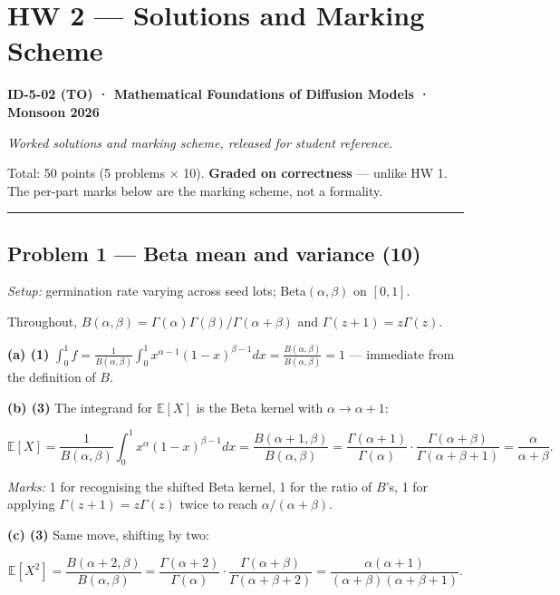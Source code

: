 \documentclass[
  11pt,
  a4paper,
]{article}
\author{}
\date{}
\newcommand{\EE}{\mathbb{E}}
\begin{document}
\section{HW 2 --- Solutions and Marking
Scheme}\label{hw-2-solutions-and-marking-scheme}

\textbf{ID-5-02 (TO) · Mathematical Foundations of Diffusion Models ·
Monsoon 2026}

\emph{Worked solutions and marking scheme, released for student
reference.}

Total: 50 points (5 problems × 10). \textbf{Graded on correctness} ---
unlike HW 1. The per-part marks below are the marking scheme, not a
formality.

\begin{center}\rule{0.5\linewidth}{0.5pt}\end{center}

\subsection{Problem 1 --- Beta mean and variance
(10)}\label{problem-1-beta-mean-and-variance-10}

\emph{Setup:} germination rate varying across seed lots;
Beta\((\alpha,\beta)\) on \([0,1]\).

Throughout,
\(B(\alpha,\beta) = \Gamma(\alpha)\Gamma(\beta)/\Gamma(\alpha+\beta)\)
and \(\Gamma(z+1) = z\Gamma(z)\).

\textbf{(a) (1)}
\(\int_0^1 f = \frac{1}{B(\alpha,\beta)}\int_0^1 x^{\alpha-1}(1-x)^{\beta-1}dx
= \frac{B(\alpha,\beta)}{B(\alpha,\beta)} = 1\) --- immediate from the
definition of \(B\).

\textbf{(b) (3)} The integrand for \(\EE[X]\) is the Beta kernel with
\(\alpha \to \alpha+1\):

\[
\EE[X] = \frac{1}{B(\alpha,\beta)}\int_0^1 x^{\alpha}(1-x)^{\beta-1}dx
= \frac{B(\alpha+1,\beta)}{B(\alpha,\beta)}
= \frac{\Gamma(\alpha+1)}{\Gamma(\alpha)}\cdot\frac{\Gamma(\alpha+\beta)}{\Gamma(\alpha+\beta+1)}
= \frac{\alpha}{\alpha+\beta}.
\]

\emph{Marks:} 1 for recognising the shifted Beta kernel, 1 for the ratio
of \(B\)'s, 1 for applying \(\Gamma(z+1)=z\Gamma(z)\) twice to reach
\(\alpha/(\alpha+\beta)\).

\textbf{(c) (3)} Same move, shifting by two:

\[
\EE[X^2] = \frac{B(\alpha+2,\beta)}{B(\alpha,\beta)}
= \frac{\Gamma(\alpha+2)}{\Gamma(\alpha)}\cdot\frac{\Gamma(\alpha+\beta)}{\Gamma(\alpha+\beta+2)}
= \frac{\alpha(\alpha+1)}{(\alpha+\beta)(\alpha+\beta+1)} .
\]
\end{document}
